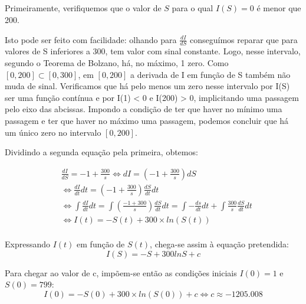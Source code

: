 \documentclass[portuguese, a4paper]{article}
\begin{document}
	\subsection{}
		\subsubsection{}
		\par %
		Primeiramente, verifiquemos que o valor de $S$ para o qual $I(S) = 0$ é menor que 200.
		\par
		Isto pode ser feito com facilidade: olhando para $\frac{dI}{dS}$ conseguímos reparar que para valores
		de S inferiores a 300, tem valor com sinal constante. Logo, nesse intervalo, segundo o Teorema de Bolzano,
		há, no máximo, 1 zero. Como $[0, 200] \subset [0, 300]$, em $[0, 200]$ a derivada de I em função de S também não muda de sinal.
		Verificamos que há pelo menos um zero nesse intervalo por I(S) ser uma função contínua e por I(1) < 0 e I(200) > 0, 
		implicitando uma passagem pelo eixo das abcissas. Impondo a condição de ter que haver no mínimo uma passagem e ter que haver no máximo uma passagem, 
		podemos concluir que há um único zero no intervalo $[0, 200]$.
		\par
		Dividindo a segunda equação pela primeira, obtemos:
		
		\begin{equation} \label{di}
		\begin{split}
			& \frac{dI}{dS} = -1 + \frac{300}{s}
			\Leftrightarrow dI = \left(-1 + \frac{300}{s}\right)dS   \\ 
			& \Leftrightarrow \frac{dI}{dt} dt = \left( -1 + \frac{300}{s}\right) \frac{dS}{dt} dt \\ 
			& \Leftrightarrow \int\frac{dI}{dt}dt = \int\left(\frac{-1 + 300}{s}\right)\frac{dS}{dt}dt =
			\int - \frac{ds}{dt}dt + \int\frac{300}{s}\frac{dS}{dt}dt \\
			& \Leftrightarrow I(t) = -S(t) + 300 \times ln(S(t)) \\
		\end{split}
		\end{equation}

		Expressando $I(t)$ em função de $S(t)$, chega-se assim à equação pretendida:
        $$I(S) = -S + 300 ln S + c$$
        
		Para chegar ao valor de c, impõem-se então as condições iniciais $I(0) = 1$ e $S(0) = 799$:
		$$I(0) = -S(0) + 300 \times ln(S(0)) + c \Leftrightarrow c \approx -1205.008$$
\end{document}
